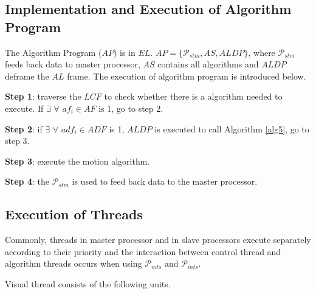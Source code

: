 \documentclass[journal,UTF8]{IEEEtran}
\begin{document}




\subsection{Implementation and Execution of Algorithm Program }
The Algorithm Program ($AP$) is in $EL$. $AP=\{\mathcal{P}_{stm}, AS, ALDP\}$, where $\mathcal{P}_{stm}$ feeds back data to master processor, $AS$ contains all algorithms and $ALDP$ deframe the $AL$ frame. The execution of algorithm program is introduced below.

\textbf{Step 1}: traverse the $LCF$ to check whether there is a algorithm needed to execute. If $\exists$ $\forall$ $af_i \in AF$ is 1, go to step 2.

\textbf{Step 2}: if $\exists$ $\forall$ $adf_i \in ADF$ is 1, $ALDP$ is executed to call Algorithm \ref{alg5}, go to step 3. 

\textbf{Step 3}: execute the motion algorithm.

\textbf{Step 4}: the $\mathcal{P}_{stm}$ is used to feed back data to the master processor. 

\subsection{Execution of Threads}
 Commonly, threads in master processor and in slave processors execute separately according to their priority and the interaction between control thread and algorithm threads occurs when using $\mathcal{P}_{mts}$ and $\mathcal{P}_{mts}$. 
 
 Visual thread consists of the following units.
 
\end{document}

